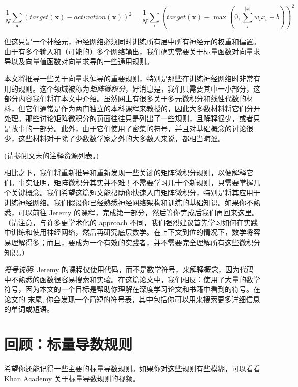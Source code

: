 \documentclass[11pt]{article}
\begin{document}
\[
\frac{1}{N} \sum_{\mathbf{x}} (target(\mathbf{x}) - activation(\mathbf{x}))^2 = \frac{1}{N} \sum_{\mathbf{x}} (target(\mathbf{x}) - \max(0, \sum_i^{|x|} w_i x_i + b))^2
\]

但这只是一个神经元，神经网络必须同时训练所有层中所有神经元的权重和偏置。由于有多个输入和（可能的）多个网络输出，我们确实需要关于标量函数对向量求导以及向量值函数对向量求导的一些通用规则。

本文将推导一些关于向量求偏导的重要规则，特别是那些在训练神经网络时非常有用的规则。这个领域被称为{\em 矩阵微积分}，好消息是，我们只需要其中一小部分，这部分内容我们将在本文中介绍。虽然网上有很多关于多元微积分和线性代数的材料，但它们通常是作为两门独立的本科课程来教授的，因此大多数材料将它们分开处理。那些讨论矩阵微积分的页面往往只是列出了一些规则，且解释很少，或者只是故事的一部分。此外，由于它们使用了密集的符号，并且对基础概念的讨论很少，这些材料对于除了少数数学家之外的大多数人来说，都相当晦涩。

(请参阅文末的注释资源列表。)

相比之下，我们将重新推导和重新发现一些关键的矩阵微积分规则，以便解释它们。事实证明，矩阵微积分其实并不难！不需要学习几十个新规则，只需要掌握几个关键概念。我们希望这篇短文能帮助你快速入门矩阵微积分，特别是将其应用于训练神经网络。我们假设你已经熟悉神经网络架构和训练的基础知识。如果你不熟悉，可以前往 \href{http://course.fast.ai}{Jeremy 的课程}，完成第一部分，然后等你完成后我们再回来这里。（请注意，与许多更学术化的 approach 不同，我们强烈建议首先学习如何在实践中训练和使用神经网络，然后再研究底层数学。在上下文到位的情况下，数学将容易理解得多；而且，要成为一个有效的实践者，并不需要完全理解所有这些微积分知识。）

{\em 符号说明}: Jeremy 的课程仅使用代码，而不是数学符号，来解释概念，因为代码中不熟悉的函数很容易搜索和实验。在这篇论文中，我们相反：使用了大量的数学符号，因为本文的一个目标是帮助你理解在深度学习论文和书籍中看到的符号。在论文的 \href{\#notation}{末尾}, 你会发现一个简短的符号表，其中包括你可以用来搜索更多详细信息的单词或短语。


\section{回顾：标量导数规则}\label{sec2}

希望你还能记得一些主要的标量导数规则。如果你对这些规则有些模糊，可以看看 \href{https://www.khanacademy.org/math/ap-calculus-ab/ab-derivative-rules}{Khan Academy 关于标量导数规则的视频}。
\end{document}
